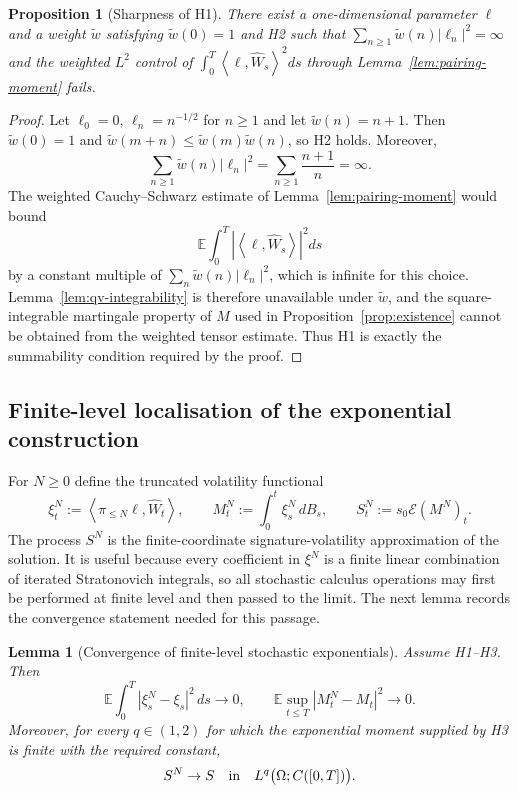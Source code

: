 \documentclass[11pt,oneside]{article}
\theoremstyle{plain}
\newtheorem{proposition}[theorem]{Proposition}
\newtheorem{lemma}[theorem]{Lemma}
\theoremstyle{definition}
\theoremstyle{remark}
\newcommand{\E}{\mathbb{E}}
\newcommand{\cW}{\widehat W}
\newcommand{\abs}[1]{\left\lvert #1\right\rvert}
\newcommand{\inner}[2]{\left\langle #1,#2\right\rangle}
\begin{document}
\begin{proposition}[Sharpness of H1]\label{prop:sharpness-A}
There exist a one-dimensional parameter $\ell$ and a weight $\widetilde w$ satisfying $\widetilde w(0)=1$ and H2 such that $\sum_{n\geq1}\widetilde w(n)\abs{\ell_n}^2=\infty$ and the weighted $L^2$ control of $\int_0^T\inner{\ell}{\cW_s}^2ds$ through Lemma~\ref{lem:pairing-moment} fails.
\end{proposition}

\begin{proof}
Let $\ell_0=0$, $\ell_n=n^{-1/2}$ for $n\geq1$ and let $\widetilde w(n)=n+1$. Then $\widetilde w(0)=1$ and $\widetilde w(m+n)\leq \widetilde w(m)\widetilde w(n)$, so H2 holds. Moreover,
\[
\sum_{n\geq1}\widetilde w(n)\abs{\ell_n}^2=\sum_{n\geq1}\frac{n+1}{n}=\infty.
\]
The weighted Cauchy--Schwarz estimate of Lemma~\ref{lem:pairing-moment} would bound
\[
\E\int_0^T\abs{\inner{\ell}{\cW_s}}^2ds
\]
by a constant multiple of $\sum_n\widetilde w(n)\abs{\ell_n}^2$, which is infinite for this choice. Lemma~\ref{lem:qv-integrability} is therefore unavailable under $\widetilde w$, and the square-integrable martingale property of $M$ used in Proposition~\ref{prop:existence} cannot be obtained from the weighted tensor estimate. Thus H1 is exactly the summability condition required by the proof.
\end{proof}


\subsection{Finite-level localisation of the exponential construction}
\label{subsec:finite-level-localisation}
For $N\geq 0$ define the truncated volatility functional
\[
\xi^N_t:=\inner{\pi_{\leq N}\ell}{\cW_t},
\qquad
M^N_t:=\int_0^t \xi^N_s\,dB_s,
\qquad
S^N_t:=s_0\mathcal E(M^N)_t .
\]
The process $S^N$ is the finite-coordinate signature-volatility approximation of the solution. It is useful because every coefficient in $\xi^N$ is a finite linear combination of iterated Stratonovich integrals, so all stochastic calculus operations may first be performed at finite level and then passed to the limit. The next lemma records the convergence statement needed for this passage.

\begin{lemma}[Convergence of finite-level stochastic exponentials]
\label{lem:finite-level-exponential-convergence}
Assume H1--H3. Then
\[
\E\int_0^T \abs{\xi^N_s-\xi_s}^2\,ds\to 0,
\qquad
\E\sup_{t\leq T}\abs{M^N_t-M_t}^2\to 0.
\]
Moreover, for every $q\in(1,2)$ for which the exponential moment supplied by H3 is finite with the required constant,
\[
S^N\to S
\quad\hbox{in}\quad L^q\bigl(\Omega;C([0,T])\bigr).
\]
\end{lemma}
\end{document}
